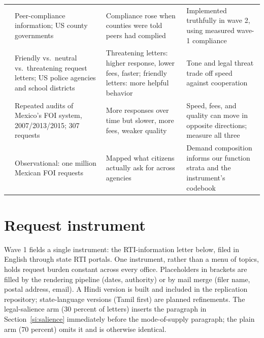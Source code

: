 \documentclass[11pt]{article}
\begin{document}
\begin{table}[htbp]
\begin{tabularx}{\textwidth}{>{\raggedright\arraybackslash}p{2.6cm}LLL}
\addlinespace
\citet{benaaron2017} & Peer-compliance information; US county governments & Compliance rose when counties were told peers had complied & Implemented truthfully in wave 2, using measured wave-1 compliance \\
\addlinespace
\citet{cuillier2010} & Friendly vs.\ neutral vs.\ threatening request letters; US police agencies and school districts & Threatening letters: higher response, lower fees, faster; friendly letters: more helpful behavior & Tone and legal threat trade off speed against cooperation \\
\addlinespace
\citet{lagunes2019} & Repeated audits of Mexico's FOI system, 2007/2013/2015; 307 requests & More responses over time but slower, more fees, weaker quality & Speed, fees, and quality can move in opposite directions; measure all three \\
\addlinespace
\citet{berliner2018} & Observational: one million Mexican FOI requests & Mapped what citizens actually ask for across agencies & Demand composition informs our function strata and the instrument's codebook \\
\bottomrule
\end{tabularx}
\end{table}

\section{Request instrument}
\label{si:instruments}

Wave 1 fields a single instrument: the RTI-information letter below, filed in English through state RTI portals. One instrument, rather than a menu of topics, holds request burden constant across every office. Placeholders in brackets are filled by the rendering pipeline (dates, authority) or by mail merge (filer name, postal address, email). A Hindi version is built and included in the replication repository; state-language versions (Tamil first) are planned refinements. The legal-salience arm (30 percent of letters) inserts the paragraph in Section~\ref{si:salience} immediately before the mode-of-supply paragraph; the plain arm (70 percent) omits it and is otherwise identical.
\end{document}
